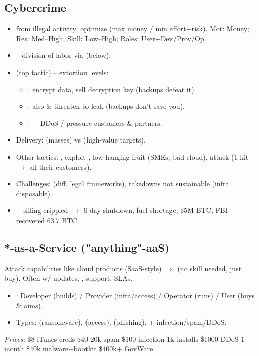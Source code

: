 \subsection{Cybercrime}
\begin{itemize}
\item {} from illegal activity; optimize  (max money / min effort+risk). Mot: Money; Res: Med--High; Skill: Low--High; Roles: User+Dev/Prov/Op.
\item {} -- division of labor via  (below).
\item {} (top tactic) -- extortion levels:
  \begin{itemize}
  \item {}: encrypt data, sell decryption key (backups defeat it).
  \item {}: also  \& threaten to leak (backups don't save you).
  \item {}: + DDoS / pressure customers \& partners.
  \end{itemize}
\item Delivery:  (masses) vs  (high-value targets).
\item Other tactics: , exploit , low-hanging fruit (SMEs, bad cloud), attack  (1 hit $\to$ all their customers).
\item Challenges:  (diff. legal frameworks), takedowns not sustainable (infra disposable).
\item {} -- billing crippled $\to$ 6-day shutdown, fuel shortage, \$5M BTC; FBI recovered 63.7 BTC.
\end{itemize}

\subsection{*-as-a-Service ("anything"-aaS)}
Attack capabilities  like cloud products (SaaS-style) $\Rightarrow$  (no skill needed, just buy). Often w/ updates, , support, SLAs.
\begin{itemize}
\item {}: Developer (builds) / Provider (infra/access) / Operator (runs) / User (buys \& aims).
\item Types:  (ransomware),  (access),  (phishing), + infection/spam/DDoS.
\end{itemize}
\textit{Prices:} {\scriptsize \$8 iTunes creds \textbullet{} \$40 20k spam \textbullet{} \$100 infection 1k installs \textbullet{} \$1000 DDoS 1 month \textbullet{} \$40k malware+bootkit \textbullet{} \$400k+ GovWare}

